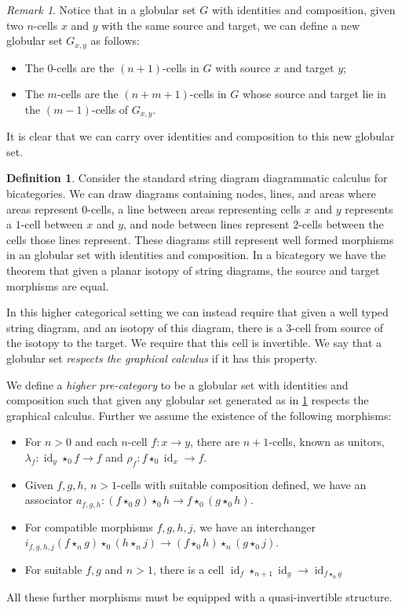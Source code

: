 \documentclass{article}
\theoremstyle{definition}
\newtheorem{definition}{Definition}
\theoremstyle{remark}
\newtheorem{remark}{Remark}
\DeclareMathOperator{\id}{id}
\newcommand{\comp}{\star}
\begin{document}
\begin{remark}\label{descendants}
  Notice that in a globular set \(G\) with identities and composition, given two \(n\)-cells \(x\) and \(y\) with the same source and target, we can define a new globular set \(G_{x,y}\) as follows:
  \begin{itemize}
  \item The \(0\)-cells are the \((n+1)\)-cells in \(G\) with source \(x\) and target \(y\);
  \item The \(m\)-cells are the \((n+m+1)\)-cells in \(G\) whose source and target lie in the \((m-1)\)-cells of \(G_{x,y}\).
  \end{itemize}
  It is clear that we can carry over identities and composition to this new globular set.
\end{remark}



\begin{definition}\label{def:higher-cat}
  Consider the standard string diagram diagrammatic calculus for bicategories. We can draw diagrams containing nodes, lines, and areas where areas represent \(0\)-cells, a line between areas representing cells \(x\) and \(y\) represents a \(1\)-cell between \(x\) and \(y\), and node between lines represent \(2\)-cells between the cells those lines represent. These diagrams still represent well formed morphisms in an globular set with identities and composition. In a bicategory we have the theorem that given a planar isotopy of string diagrams, the source and target morphisms are equal.

  In this higher categorical setting we can instead require that given a well typed string diagram, and an isotopy of this diagram, there is a \(3\)-cell from source of the isotopy to the target. We require that this cell is invertible. We say that a globular set \emph{respects the graphical calculus} if it has this property.

  We define a \emph{higher pre-category} to be a globular set with identities and composition such that given any globular set generated as in \cref{descendants} respects the graphical calculus. Further we assume the existence of the following morphisms:
  \begin{itemize}
  \item For \(n>0\) and each \(n\)-cell \(f: x \to y\), there are \(n+1\)-cells, known as unitors, \(\lambda_f: \id_y \comp_0 f \to f\) and \(\rho_f: f \comp_0 \id_x \to f\).
  \item Given \(f,g,h\), \(n>1\)-cells with suitable composition defined, we have an associator \(a_{f,g,h} : (f \comp_0 g) \comp_0 h \to f \comp_0 (g \comp_0 h)\).
  \item For compatible morphisms \(f,g,h,j\), we have an interchanger \(i_{f,g,h,j}(f \comp_n g) \comp_0 (h \comp_n j) \to (f \comp_0 h) \comp_n (g \comp_0 j)\).
  \item For suitable \(f,g\) and \(n > 1\), there is a cell \(\id_f \comp_{n+1} \id_g \to \id_{f \comp_n g}\)
  \end{itemize}
  All these further morphisms must be equipped with a quasi-invertible structure.
\end{definition}
\end{document}
